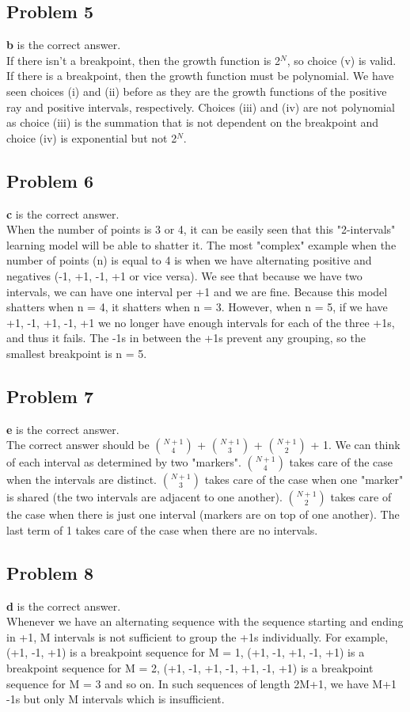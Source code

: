 \documentclass[12 pt]{article}
\begin{document}
	\subsection*{Problem 5}
	\textbf{b} is the correct answer.\\
	If there isn't a breakpoint, then the growth function is 2$^N$, so choice (v) is valid. If there is a breakpoint, then the growth function must be polynomial. We have seen choices (i) and (ii) before as they are the growth functions of the positive ray and positive intervals, respectively. Choices (iii) and (iv) are not polynomial as choice (iii) is the summation that is not dependent on the breakpoint and choice (iv) is exponential but not 2$^N$.

		
	\subsection*{Problem 6}
	\textbf{c} is the correct answer. \\
	When the number of points is 3 or 4, it can be easily seen that this "2-intervals" learning model will be able to shatter it. The most "complex" example when the number of points (n) is equal to 4 is when we have alternating positive and negatives (-1, +1, -1, +1 or vice versa). We see that because we have two intervals, we can have one interval per +1 and we are fine. Because this model shatters when n = 4, it shatters when n = 3. However, when n = 5, if we have +1, -1, +1, -1, +1 we no longer have enough intervals for each of the three +1s, and thus it fails. The -1s in between the +1s prevent any grouping, so the smallest breakpoint is n = 5.
		
	\subsection*{Problem 7}
	\textbf{e} is the correct answer. \\
	The correct answer should be $\binom{N+1}{4}$ + $\binom{N+1}{3}$ + $\binom{N+1}{2}$ + 1. We can think of each interval as determined by two "markers". $\binom{N+1}{4}$ takes care of the case when the intervals are distinct. $\binom{N+1}{3}$ takes care of the case when one "marker" is shared (the two intervals are adjacent to one another). $\binom{N+1}{2}$ takes care of the case when there is just one interval (markers are on top of one another). The last term of 1 takes care of the case when there are no intervals. 
		
	
	\subsection*{Problem 8}
	\textbf{d} is the correct answer. \\
	Whenever we have an alternating sequence with the sequence starting and ending in +1, M intervals is not sufficient to group the +1s individually. For example, (+1, -1, +1) is a breakpoint sequence for M = 1, (+1, -1, +1, -1, +1) is a breakpoint sequence for M = 2, (+1, -1, +1, -1, +1, -1, +1) is a breakpoint sequence for M = 3 and so on. In such sequences of length 2M+1, we have M+1 -1s but only M intervals which is insufficient.
	
\end{document}
